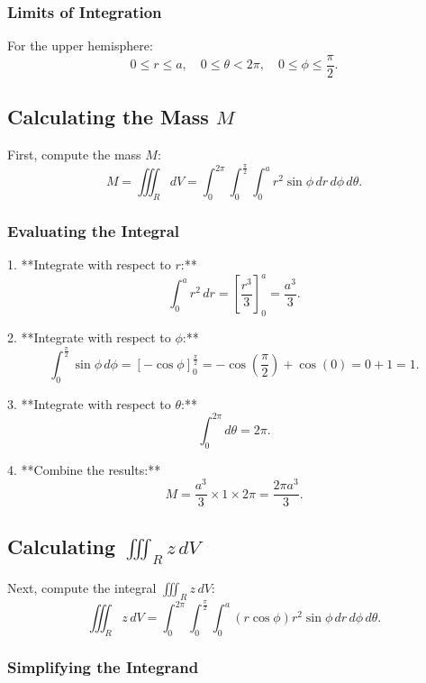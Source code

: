 \documentclass[11pt]{article}
\begin{document}
\newpage

\subsubsection{Limits of Integration}

For the upper hemisphere:
\[
0 \leq r \leq a, \quad 0 \leq \theta < 2\pi, \quad 0 \leq \phi \leq \frac{\pi}{2}.
\]

\newpage

\subsection{Calculating the Mass \( M \)}

First, compute the mass \( M \):
\[
M = \iiint_{R} dV = \int_{0}^{2\pi} \int_{0}^{\frac{\pi}{2}} \int_{0}^{a} r^2 \sin\phi \, dr \, d\phi \, d\theta.
\]

\newpage

\subsubsection{Evaluating the Integral}

1. **Integrate with respect to \( r \):**
\[
\int_{0}^{a} r^2 \, dr = \left[ \frac{r^3}{3} \right]_{0}^{a} = \frac{a^3}{3}.
\]

2. **Integrate with respect to \( \phi \):**
\[
\int_{0}^{\frac{\pi}{2}} \sin\phi \, d\phi = \left[ -\cos\phi \right]_{0}^{\frac{\pi}{2}} = -\cos\left(\frac{\pi}{2}\right) + \cos(0) = 0 + 1 = 1.
\]

3. **Integrate with respect to \( \theta \):**
\[
\int_{0}^{2\pi} d\theta = 2\pi.
\]

4. **Combine the results:**
\[
M = \frac{a^3}{3} \times 1 \times 2\pi = \frac{2\pi a^3}{3}.
\]

\newpage

\subsection{Calculating \( \iiint_{R} z \, dV \)}

Next, compute the integral \( \iiint_{R} z \, dV \):
\[
\iiint_{R} z \, dV = \int_{0}^{2\pi} \int_{0}^{\frac{\pi}{2}} \int_{0}^{a} (r \cos\phi) r^2 \sin\phi \, dr \, d\phi \, d\theta.
\]

\newpage

\subsubsection{Simplifying the Integrand}
\end{document}

